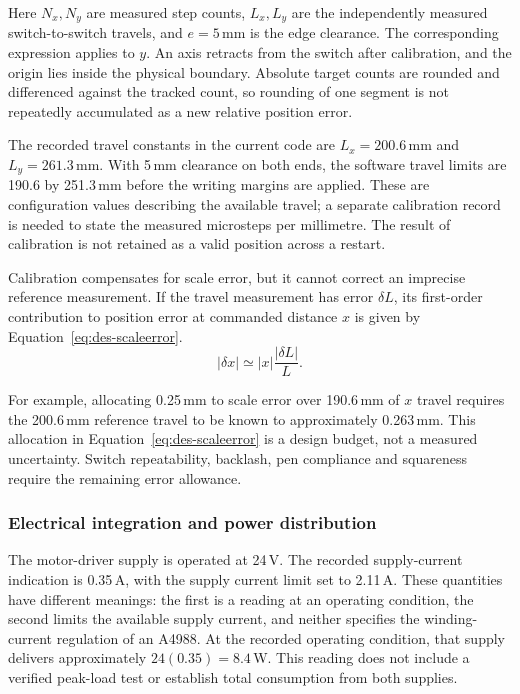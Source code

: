 Here $N_x,N_y$ are measured step counts, $L_x,L_y$ are the independently measured switch-to-switch travels, and $e=5$\,mm is the edge clearance. The corresponding expression applies to $y$. An axis retracts from the switch after calibration, and the origin lies inside the physical boundary. Absolute target counts are rounded and differenced against the tracked count, so rounding of one segment is not repeatedly accumulated as a new relative position error.~\cite[hardware clarifications; reproduce.py]{brauneevidence2026,braunepipeline2026}

The recorded travel constants in the current code are $L_x=200.6$\,mm and $L_y=261.3$\,mm. With 5\,mm clearance on both ends, the software travel limits are 190.6 by 251.3\,mm before the writing margins are applied. These are configuration values describing the available travel; a separate calibration record is needed to state the measured microsteps per millimetre. The result of calibration is not retained as a valid position across a restart.~\cite[hardware clarifications; reproduce.py]{brauneevidence2026,braunepipeline2026}

Calibration compensates for scale error, but it cannot correct an imprecise reference measurement. If the travel measurement has error $\delta L$, its first-order contribution to position error at commanded distance $x$ is given by Equation~\ref{eq:des-scaleerror}.
\begin{equation}
|\delta x|\simeq |x|\frac{|\delta L|}{L}.
\label{eq:des-scaleerror}
\end{equation}

For example, allocating 0.25\,mm to scale error over 190.6\,mm of $x$ travel requires the 200.6\,mm reference travel to be known to approximately 0.263\,mm. This allocation in Equation~\ref{eq:des-scaleerror} is a design budget, not a measured uncertainty. Switch repeatability, backlash, pen compliance and squareness require the remaining error allowance.~\cite[hardware clarifications; reproduce.py]{brauneevidence2026,braunepipeline2026}

\subsubsection{Electrical integration and power distribution}
\label{sec:des-power}
The motor-driver supply is operated at 24\,V. The recorded supply-current indication is 0.35\,A, with the supply current limit set to 2.11\,A. These quantities have different meanings: the first is a reading at an operating condition, the second limits the available supply current, and neither specifies the winding-current regulation of an A4988. At the recorded operating condition, that supply delivers approximately $24(0.35)=8.4$\,W. This reading does not include a verified peak-load test or establish total consumption from both supplies.~\cite[hardware clarifications]{brauneevidence2026}\cite[reproduce.py]{braunepipeline2026}



